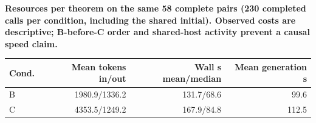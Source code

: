 \begin{center}\begin{minipage}{\linewidth}\centering
\textbf{Resources per theorem on the same 58 complete pairs (230 completed calls per condition, including the shared initial). Observed costs are descriptive; B-before-C order and shared-host activity prevent a causal speed claim.}\par\vspace{3pt}
\small
\begin{tabular}{lrrr}
\toprule
Cond. & Mean tokens in/out & Wall s mean/median & Mean generation s \\
\midrule
B & 1980.9/1336.2 & 131.7/68.6 & 99.6 \\
C & 4353.5/1249.2 & 167.9/84.8 & 112.5 \\
\bottomrule
\end{tabular}
\end{minipage}\end{center}
